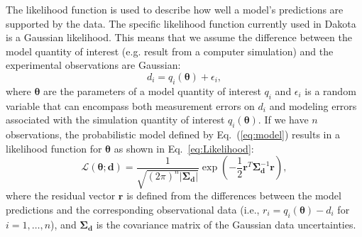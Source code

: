 The likelihood function is used to describe how well a model's
predictions are supported by the data.  
The specific likelihood function currently used in Dakota is a Gaussian
likelihood. This means that we assume the difference between the model quantity of interest
(e.g. result from a computer simulation) and the experimental observations are Gaussian:
\begin{equation}
d_i = q_i(\boldsymbol{\theta}) + \epsilon_i, \label{eq:model}
\end{equation}
where $\boldsymbol{\theta}$ are the parameters of a model quantity of interest $q_i$ and
$\epsilon_i$ is a random variable that can encompass both measurement
errors on $d_i$ and modeling errors associated with the simulation quantity of interest 
$q_i(\boldsymbol{\theta})$. %
If we have $n$ observations, the probabilistic model defined by 
Eq.~(\ref{eq:model}) results in a likelihood function for $\boldsymbol{\theta}$ 
as shown in Eq.~\ref{eq:Likelihood}:
\begin{equation}
\mathcal{L}(\boldsymbol{\theta;d}) = 
\frac{1}{\sqrt{(2\pi)^n |\boldsymbol{\Sigma_d}|}}
\exp \left(
-\frac{1}{2} \boldsymbol{r}^T \boldsymbol{\Sigma}_{\boldsymbol{d}}^{-1} \boldsymbol{r} 
\right), \label{eq:Likelihood}
\end{equation}
where the residual vector $\boldsymbol{r}$ is defined from the
differences between the model predictions and the corresponding
observational data (i.e., $r_i = q_i(\boldsymbol{\theta}) - d_i$ for $i = 1,\dots,n$), and
$\boldsymbol{\Sigma_d}$ is the covariance matrix of the Gaussian data
uncertainties. %

